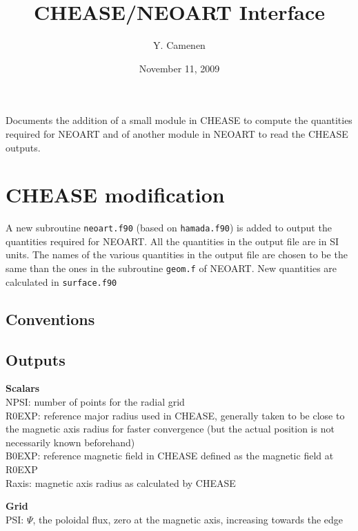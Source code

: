\documentclass[a4paper,12pt]{article}
\title{CHEASE/NEOART Interface}
\author{Y. Camenen}
\date{November 11, 2009}
\begin{document}
\maketitle

%

Documents the addition of a small module in CHEASE to compute the quantities required for NEOART and of another module in NEOART to read the CHEASE outputs.


\section{CHEASE modification}

A new subroutine \texttt{neoart.f90} (based on \texttt{hamada.f90}) is added to output the quantities required for NEOART. All the quantities in the output file are in SI units. The names of
the various quantities in the output file are chosen to be the same than the ones in the subroutine \texttt{geom.f} of NEOART.
New quantities are calculated in \texttt{surface.f90}
\subsection{Conventions}


\subsection{Outputs}
\textbf{Scalars}\\
NPSI: number of points for the radial grid\\
R0EXP: reference major radius used in CHEASE, generally taken to be close to the magnetic axis radius for faster convergence (but the actual position is not necessarily known beforehand)\\
B0EXP: reference magnetic field in CHEASE defined as the magnetic field at R0EXP\\
Raxis: magnetic axis radius as calculated by CHEASE
\vspace{0.5cm}

\textbf{Grid}\\
PSI: $\Psi$, the poloidal flux, zero at the magnetic axis, increasing towards the edge
\vspace{0.5cm}
\end{document}
